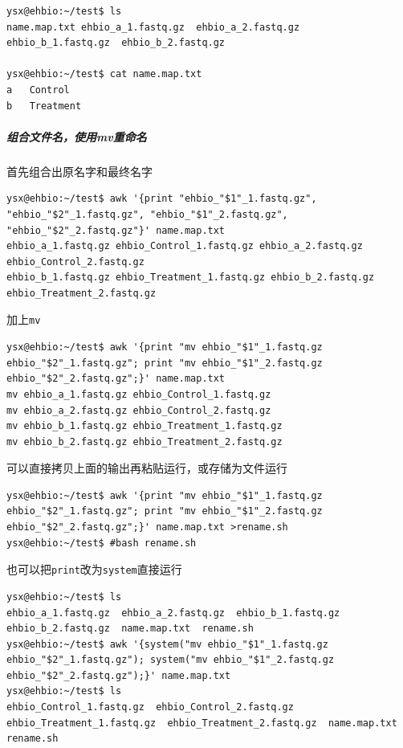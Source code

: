\documentclass[]{article}
\numberwithin{figure}{section}
\numberwithin{table}{section}
\begin{document}
\begin{verbatim}
ysx@ehbio:~/test$ ls
name.map.txt ehbio_a_1.fastq.gz  ehbio_a_2.fastq.gz  ehbio_b_1.fastq.gz  ehbio_b_2.fastq.gz

ysx@ehbio:~/test$ cat name.map.txt
a	Control
b	Treatment
\end{verbatim}

\hypertarget{rename_combine_name}{%
\subparagraph{组合文件名，使用mv重命名}\label{rename_combine_name}}

首先组合出原名字和最终名字

\begin{verbatim}
ysx@ehbio:~/test$ awk '{print "ehbio_"$1"_1.fastq.gz", "ehbio_"$2"_1.fastq.gz", "ehbio_"$1"_2.fastq.gz",  "ehbio_"$2"_2.fastq.gz"}' name.map.txt
ehbio_a_1.fastq.gz ehbio_Control_1.fastq.gz ehbio_a_2.fastq.gz ehbio_Control_2.fastq.gz
ehbio_b_1.fastq.gz ehbio_Treatment_1.fastq.gz ehbio_b_2.fastq.gz ehbio_Treatment_2.fastq.gz
\end{verbatim}

加上\texttt{mv}

\begin{verbatim}
ysx@ehbio:~/test$ awk '{print "mv ehbio_"$1"_1.fastq.gz ehbio_"$2"_1.fastq.gz"; print "mv ehbio_"$1"_2.fastq.gz ehbio_"$2"_2.fastq.gz";}' name.map.txt
mv ehbio_a_1.fastq.gz ehbio_Control_1.fastq.gz
mv ehbio_a_2.fastq.gz ehbio_Control_2.fastq.gz
mv ehbio_b_1.fastq.gz ehbio_Treatment_1.fastq.gz
mv ehbio_b_2.fastq.gz ehbio_Treatment_2.fastq.gz
\end{verbatim}

可以直接拷贝上面的输出再粘贴运行，或存储为文件运行

\begin{verbatim}
ysx@ehbio:~/test$ awk '{print "mv ehbio_"$1"_1.fastq.gz ehbio_"$2"_1.fastq.gz"; print "mv ehbio_"$1"_2.fastq.gz ehbio_"$2"_2.fastq.gz";}' name.map.txt >rename.sh
ysx@ehbio:~/test$ #bash rename.sh
\end{verbatim}

也可以把\texttt{print}改为\texttt{system}直接运行

\begin{verbatim}
ysx@ehbio:~/test$ ls
ehbio_a_1.fastq.gz  ehbio_a_2.fastq.gz  ehbio_b_1.fastq.gz  ehbio_b_2.fastq.gz  name.map.txt  rename.sh
ysx@ehbio:~/test$ awk '{system("mv ehbio_"$1"_1.fastq.gz ehbio_"$2"_1.fastq.gz"); system("mv ehbio_"$1"_2.fastq.gz ehbio_"$2"_2.fastq.gz");}' name.map.txt
ysx@ehbio:~/test$ ls
ehbio_Control_1.fastq.gz  ehbio_Control_2.fastq.gz  ehbio_Treatment_1.fastq.gz  ehbio_Treatment_2.fastq.gz  name.map.txt  rename.sh
\end{verbatim}
\end{document}
